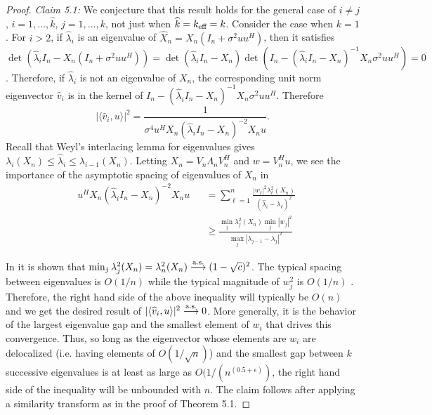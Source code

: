 \begin{proof}
\textit{Claim 5.1:}  We conjecture that this result holds for the general case of $i\neq
j$, $i=1,\dots,\widehat{k}$, $j=1,\dots,k$, not just when $\widehat{k}=k_\text{eff}=k$. Consider
the case when $k=1$. For $i>2$, if $\widehat{\lambda}_i$ is an eigenvalue of
$\widehat{X}_n=X_n(I_n+\sigma^2uu^H)$, then it satisfies
$\det(\widehat{\lambda}_iI_n-X_n(I_n+\sigma^2uu^H)) =
\det(\widehat{\lambda}_iI_n-X_n)\det(I_n-(\widehat{\lambda}_iI_n-X_n)^{-1}X_n\sigma^2uu^H)=0$. Therefore,
if $\widehat{\lambda}_i$ is not an eigenvalue of $X_n$, the corresponding unit norm
eigenvector $\widehat{v}_i$ is in the kernel of
$I_n-(\widehat{\lambda}_iI_n-X_n)^{-1}X_n\sigma^2uu^H$. Therefore
\begin{equation*}
  |\langle \widehat{v}_i,u\rangle |^2 = \frac{1}{\sigma^4u^HX_n\left(\widehat{\lambda}_iI_n-X_n\right)^{-2}X_nu}.
\end{equation*}
Recall that Weyl's interlacing lemma for eigenvalues gives $\lambda_i(X_n)\leq
\widehat{\lambda}_i\leq \lambda_{i-1}(X_n)$. Letting $X_n=V_n\Lambda_nV_n^H$ and
$w=V_n^Hu$, we see the importance of the
asymptotic spacing of eigenvalues of $X_n$ in
\begin{equation*}
\begin{aligned}
  &u^HX_n(\widehat{\lambda}_iI_n-X_n)^{-2}X_nu
  &&=\sum_{\ell=1}^n\frac{|w_\ell|^2\lambda_\ell^2(X_n)}{\left(\widehat{\lambda}_i-\lambda_\ell\right)^2}\\
  &&&\geq
  \frac{\min_j\lambda_j^2(X_n)\min_j|w_j|^2}{\max_j |\lambda_{j-1}-\lambda_j|^2}
\end{aligned}
\end{equation*}

In \cite{silverstein1985smallest} it is shown that $\min_j\lambda_j^2(X_n)=\lambda_n^2(X_n)
\overset{\textrm{a.s.}}{\longrightarrow} (1-\sqrt{c})^2$. The typical spacing between eigenvalues is $O(1/n)$ while the
typical magnitude of $w_j^2$ is $O(1/n)$ \cite{barvinok2005measure}. Therefore, the right hand side of the above inequality will typically be $O(n)$ and we get the desired
result of $|\langle \widehat{v}_i,u\rangle |^2\overset{\textrm{a.s.}}{\longrightarrow} 0$. More generally, it is the
behavior of the largest eigenvalue gap and the smallest element of $w_i$ that drives this
convergence. Thus, so long as the eigenvector whose elements are $w_i$ are delocalized
(i.e. having elements of $O(1/\sqrt{n})$) and the smallest gap between $k$ successive
eigenvalues is at least as large as $O(1/(n^{(0.5+ \epsilon)})$, the right hand side of the inequality will be unbounded with $n$. The claim follows after applying a similarity transform as in the
proof of Theorem 5.1.


\end{proof}
